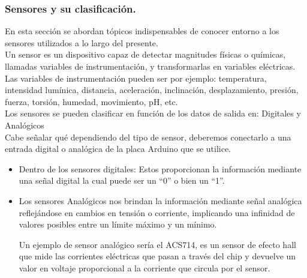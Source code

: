 \documentclass[11pt,letter
								]
								{article}
\begin{document}
	\subsubsection{Sensores y su clasificación. }


En esta sección se abordan tópicos indispensables de conocer entorno a los sensores utilizados a lo largo del presente. \\
Un sensor es un dispositivo capaz de detectar magnitudes físicas o químicas, llamadas variables de instrumentación, y transformarlas en variables eléctricas.
Las variables de instrumentación pueden ser por ejemplo: temperatura, intensidad lumínica, distancia, aceleración, inclinación, desplazamiento, presión, fuerza, torsión, humedad, movimiento, pH, etc.\cite{serna2010guia}\\

Los sensores se pueden clasificar en función de los datos de salida en: Digitales  y Analógicos\\

Cabe señalar qué dependiendo del tipo de sensor, deberemos conectarlo a una entrada digital o analógica de la placa Arduino que se utilice.
\begin {itemize}

\item Dentro de los sensores digitales: Estos proporcionan la información mediante una señal digital la cual puede ser un ``0'' o bien un ``1''.\cite{serna2010guia}\\

\item Los sensores Analógicos nos brindan la información mediante señal analógica reflejándose en cambios en tensión o corriente, implicando una infinidad de valores posibles entre un límite máximo y un mínimo. \cite{serna2010guia}

Un ejemplo de sensor analógico sería el ACS714, es un sensor de efecto hall que mide las corrientes eléctricas que pasan a través del chip y devuelve un valor en voltaje proporcional a la corriente que circula por el sensor.
\end{itemize}
	
\end{document}

